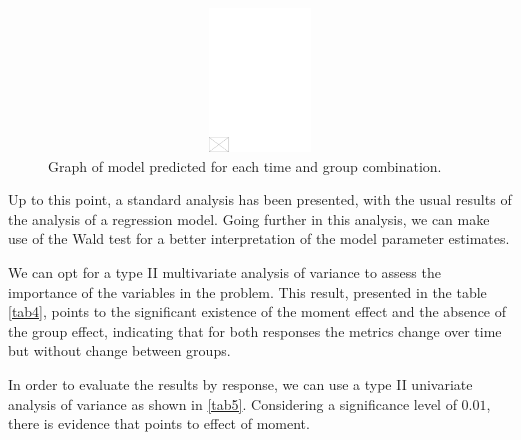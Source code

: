 \documentclass[AMA,STIX1COL]{WileyNJD-v2}
\begin{document}
\begin{figure}[h]
\centerline{\includegraphics[width=342pt,height=9pc,draft]{empty}}
\caption{Graph of model predicted for each time and group combination.\label{fig6}}
\end{figure}

  
Up to this point, a standard analysis has been presented, with the usual results of the analysis of a regression model. Going further in this analysis, we can make use of the Wald test for a better interpretation of the model parameter estimates.

We can opt for a type II multivariate analysis of variance to assess the importance of the variables in the problem. This result, presented in the table \autoref{tab4}, points to the significant existence of the moment effect and the absence of the group effect, indicating that for both responses the metrics change over time but without change between groups.

In order to evaluate the results by response, we can use a type II univariate analysis of variance as shown in \autoref{tab5}. Considering a significance level of $0.01$, there is evidence that points to effect of moment.
\end{document}

